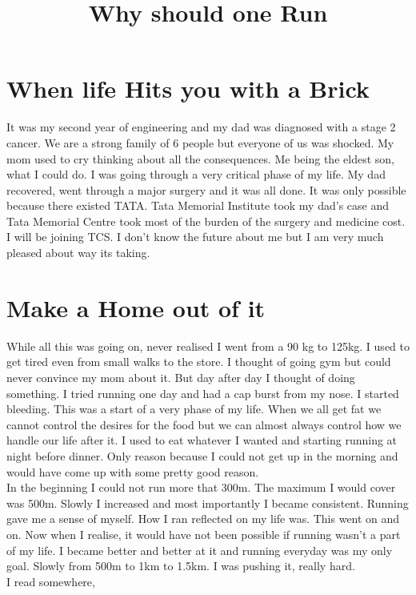 \documentclass[]{article}
\begin{document}
\title{Why should one Run}
\date{}
\maketitle

\section*{When life Hits you with a Brick}
It was my second year of engineering and my dad was diagnosed with a stage 2 cancer. We are a strong family of 6 people but everyone of us was shocked. My mom used to cry thinking about all the consequences. Me being the eldest son, what I could do. I was going through a very critical phase of my life. My dad recovered, went through a major surgery and it was all done. It was only possible because there existed TATA. Tata Memorial Institute took my dad's case and Tata Memorial Centre took most of the burden of the surgery and medicine cost. I will be joining TCS. I don't know the future about me but I am very much pleased about way its taking.

\section*{ Make a Home out of it }
While all this was going on, never realised I went from a 90 kg to 125kg. I used to get tired even from small walks to the store. I thought of going gym but could never convince my mom about it. 
But day after day I thought of doing something. I tried running one day and had a cap burst from my nose. I started bleeding. This was a start of a very phase of my life. When we all get fat we cannot control the desires for the food but we can almost always control how we handle our life after it. I used to eat whatever I wanted and starting running at night before dinner. Only reason because I could not get up in the morning and would have come up with some pretty good reason.\\
In the beginning I could not run more that 300m. The maximum I would cover was 500m. 
Slowly I increased and most importantly I became consistent. Running gave me a sense of myself. How I ran reflected on my life was. This went on and on. Now when I realise, it would have not been possible if running wasn't a part of my life. I became better and better at it and running everyday was my only goal. Slowly from 500m to 1km to 1.5km. I was pushing it, really hard.\\
I read somewhere, 
\begin{quote}
\end{quote} 
\end{document}
